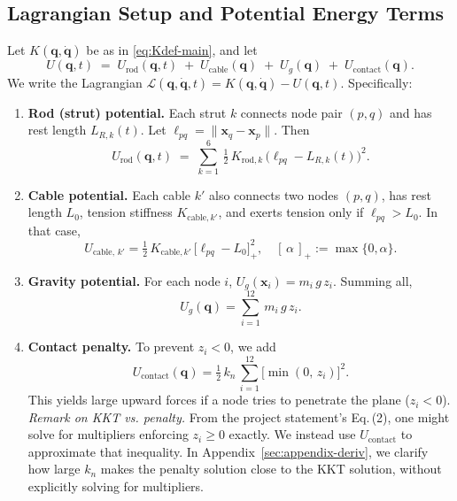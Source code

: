\documentclass[12pt,letterpaper]{article}
\newcommand{\q}{\bm{q}}
\newcommand{\qd}{\dot{\bm{q}}}
\newcommand{\x}{\bm{x}}
\newcommand{\Lag}{\mathcal{L}}
\begin{document}
\subsection{Lagrangian Setup and Potential Energy Terms}
Let $K(\q,\qd)$ be as in \eqref{eq:Kdef-main}, and let
\[
   U(\q,t) \;=\;U_{\text{rod}}(\q,t)\;+\;U_{\text{cable}}(\q)\;+\;U_g(\q)\;+\;U_{\mathrm{contact}}(\q).
\]
We write the Lagrangian $\Lag(\q,\qd,t) = K(\q,\qd) - U(\q,t)$. Specifically:

\begin{enumerate}[leftmargin=1.8em,label=(\roman*)]
  \item \textbf{Rod (strut) potential.}
    Each strut $k$ connects node pair $(p,q)$ and has rest length $L_{R,k}(t)$.  
    Let $\ell_{pq} = \|\x_q - \x_p\|$.  
    Then  
    \[
      U_{\text{rod}}(\q,t)
        \;=\;\sum_{k=1}^{6} \,\tfrac12\,K_{\text{rod},k}\,\bigl(\ell_{pq}-L_{R,k}(t)\bigr)^2.
    \]

  \item \textbf{Cable potential.}
    Each cable $k'$ also connects two nodes $(p,q)$, has rest length $L_0$, tension stiffness $K_{\text{cable},k'}$, and exerts tension only if $\ell_{pq} > L_0$.  In that case,
    \[
      U_{\text{cable},\,k'}=\tfrac12\,K_{\text{cable},k'}\,\bigl[\ell_{pq}-L_0\bigr]^2_{\!+}, 
      \quad [\,\alpha\,]_+ := \max\{0,\alpha\}.
    \]

  \item \textbf{Gravity potential.}
    For each node $i$, $U_{g}(\x_i)=m_i\,g\,z_i$. Summing all,
    \[
      U_g(\q)=\sum_{i=1}^{12}\,m_i\,g\,z_i.
    \]

  \item \textbf{Contact penalty.}
    To prevent $z_i<0$, we add
    \[
      U_{\mathrm{contact}}(\q)
        = \tfrac12\,k_{n}\,\sum_{i=1}^{12}\bigl[\min(0,\,z_i)\bigr]^{2}.
    \]
    This yields large upward forces if a node tries to penetrate the plane ($z_i<0$). 
    \\
    \textit{Remark on KKT vs. penalty.} 
    From the project statement’s Eq.\,(2), one might solve for multipliers enforcing $z_i\ge 0$ exactly. We instead use $U_{\mathrm{contact}}$ to approximate that inequality. In Appendix~\ref{sec:appendix-deriv}, we clarify how large $k_n$ makes the penalty solution close to the KKT solution, without explicitly solving for multipliers.
\end{enumerate}
\end{document}
